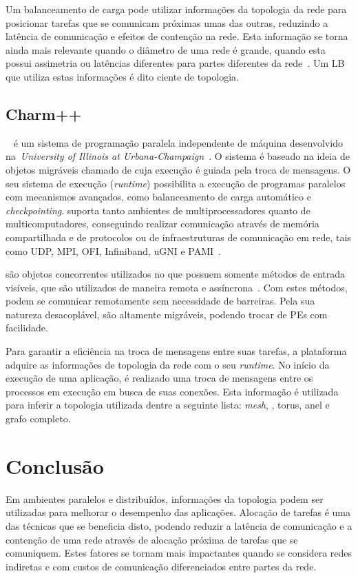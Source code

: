 Um balanceamento de carga pode utilizar informações da topologia da rede para posicionar tarefas que se comunicam próximas umas das outras, reduzindo a latência de comunicação e efeitos de contenção na rede.
Esta informação se torna ainda mais relevante quando o diâmetro de uma rede é grande, quando esta possui assimetria ou latências diferentes para partes diferentes da rede~\cite{dragonfly}.
Um LB que utiliza estas informações é dito ciente de topologia.

\subsection{Charm++}
\label{sec:charm}

\charm~\cite{website:CHARM} é um sistema de programação paralela independente de máquina desenvolvido na~\textit{University of Illinois at Urbana-Champaign}~\cite{Kale:charm}. 
O sistema é baseado na ideia de objetos migráveis chamado de \chares cuja execução é guiada pela troca de mensagens. 
O seu sistema de execução (\textit{runtime}) possibilita a execução de programas paralelos com mecanismos avançados, como balanceamento de carga automático e \textit{checkpointing}. 
\charm suporta tanto ambientes de multiprocessadores quanto de multicomputadores, conseguindo realizar comunicação através de memória compartilhada e de protocolos ou de infraestruturas de comunicação em rede, tais como UDP, MPI, OFI, Infiniband, uGNI e PAMI~\cite{pilla:CHARM}.

\Chares são objetos concorrentes utilizados no \fw \xspace \charm que possuem somente métodos de entrada visíveis, que são utilizados de maneira remota e assíncrona~\cite{Kale:charm}.
Com estes métodos, \chares podem se comunicar remotamente sem necessidade de barreiras. Pela sua natureza desacoplável, \chares são altamente migráveis, podendo trocar de PEs com facilidade. 

Para garantir a eficiência na troca de mensagens entre suas tarefas, a plataforma \charm adquire as informações de topologia da rede com o seu \textit{runtime}.
No início da execução de uma aplicação, é realizado uma troca de mensagens entre os processos em execução em busca de suas conexões.
Esta informação é utilizada para inferir a topologia utilizada dentre a seguinte lista: \textit{mesh}, \fatt, torus, anel e grafo completo. 


\section{Conclusão}
Em ambientes paralelos e distribuídos, informações da topologia podem ser utilizadas para melhorar o desempenho das aplicações.
Alocação de tarefas é uma das técnicas que se beneficia disto, podendo reduzir a latência de comunicação e a contenção de uma rede através de alocação próxima de tarefas que se comuniquem.
Estes fatores se tornam mais impactantes quando se considera redes indiretas e com custos de comunicação diferenciados entre partes da rede.

